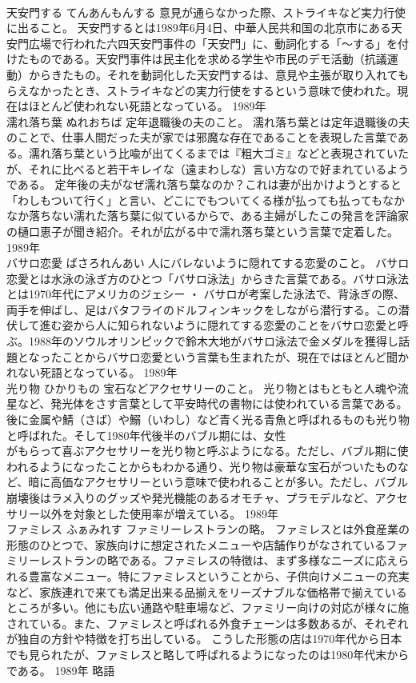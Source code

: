 \documentclass[8pt]{extreport}
\begin{document}
\begin{CJK}{UTF8}{min}
\\	天安門する	てんあんもんする	意見が通らなかった際、ストライキなど実力行使に出ること。	天安門するとは1989年6月4日、中華人民共和国の北京市にある天安門広場で行われた六四天安門事件の「天安門」に、動詞化する「～する」を付けたものである。天安門事件は民主化を求める学生や市民のデモ活動（抗議運動）からきたもの。それを動詞化した天安門するは、意見や主張が取り入れてもらえなかったとき、ストライキなどの実力行使をするという意味で使われた。現在はほとんど使われない死語となっている。	1989年	
\\	濡れ落ち葉	ぬれおちば	定年退職後の夫のこと。	濡れ落ち葉とは定年退職後の夫のことで、仕事人間だった夫が家では邪魔な存在であることを表現した言葉である。濡れ落ち葉という比喩が出てくるまでは『粗大ゴミ』などと表現されていたが、それに比べると若干キレイな（遠まわしな）言い方なので好まれているようである。 定年後の夫がなぜ濡れ落ち葉なのか？これは妻が出かけようとすると「わしもついて行く」と言い、どこにでもついてくる様が払っても払ってもなかなか落ちない濡れた落ち葉に似ているからで、ある主婦がしたこの発言を評論家の樋口恵子が聞き紹介。それが広がる中で濡れ落ち葉という言葉で定着した。	1989年	
\\	バサロ恋愛	ばさろれんあい	人にバレないように隠れてする恋愛のこと。	バサロ恋愛とは水泳の泳ぎ方のひとつ「バサロ泳法」からきた言葉である。バサロ泳法とは1970年代にアメリカのジェシー ・ バサロが考案した泳法で、背泳ぎの際、両手を伸ばし、足はバタフライのドルフィンキックをしながら潜行する。この潜伏して進む姿から人に知られないように隠れてする恋愛のことをバサロ恋愛と呼ぶ。1988年のソウルオリンピックで鈴木大地がバサロ泳法で金メダルを獲得し話題となったことからバサロ恋愛という言葉も生まれたが、現在ではほとんど聞かれない死語となっている。	1989年	
\\	光り物	ひかりもの	宝石などアクセサリーのこと。	光り物とはもともと人魂や流星など、発光体をさす言葉として平安時代の書物には使われている言葉である。後に金属や鯖（さば）や鰯（いわし）など青く光る青魚と呼ばれるものも光り物と呼ばれた。そして1980年代後半のバブル期には、女性
\\	がもらって喜ぶアクセサリーを光り物と呼ぶようになる。ただし、バブル期に使われるようになったことからもわかる通り、光り物は豪華な宝石がついたものなど、暗に高価なアクセサリーという意味で使われることが多い。ただし、バブル崩壊後はラメ入りのグッズや発光機能のあるオモチャ、プラモデルなど、アクセサリー以外を対象とした使用率が増えている。	1989年	
\\	ファミレス	ふぁみれす	ファミリーレストランの略。	ファミレスとは外食産業の形態のひとつで、家族向けに想定されたメニューや店舗作りがなされているファミリーレストランの略である。ファミレスの特徴は、まず多様なニーズに応えられる豊富なメニュー。特にファミレスということから、子供向けメニューの充実など、家族連れで来ても満足出来る品揃えをリーズナブルな価格帯で揃えているところが多い。他にも広い通路や駐車場など、ファミリー向けの対応が様々に施されている。また、ファミレスと呼ばれる外食チェーンは多数あるが、それぞれが独自の方針や特徴を打ち出している。 こうした形態の店は1970年代から日本でも見られたが、ファミレスと略して呼ばれるようになったのは1980年代末からである。	1989年	略語	

\end{CJK}
\end{document}

